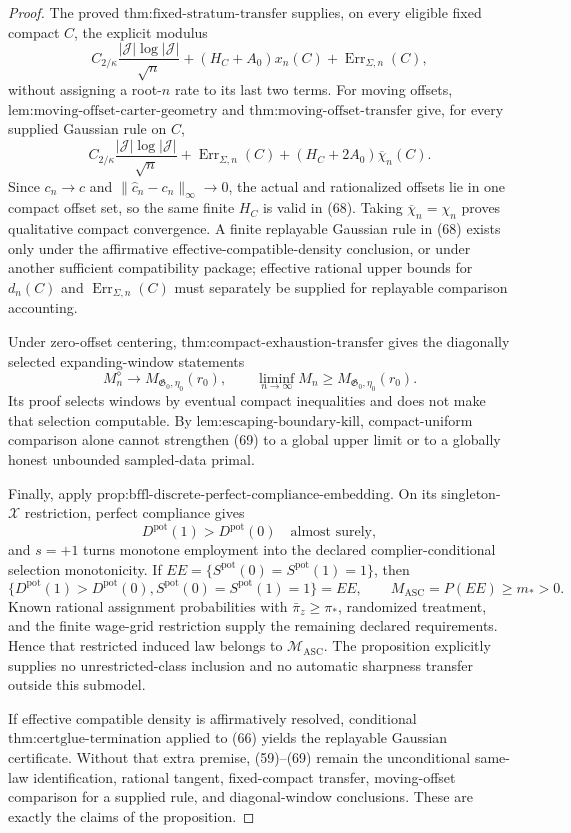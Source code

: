 \documentclass{article}
\begin{document}
\begin{proof}
The proved \(\text{thm:fixed-stratum-transfer}\) supplies, on every eligible fixed compact \(C\), the explicit modulus
\[
 C_{2/\kappa}\frac{|\mathcal J|\log|\mathcal J|}{\sqrt n}
 +(H_C+A_0)x_n(C)+\operatorname{Err}_{\Sigma,n}(C),
 \tag{67}
\]
without assigning a root-\(n\) rate to its last two terms.  For moving offsets, \(\text{lem:moving-offset-carter-geometry}\) and \(\text{thm:moving-offset-transfer}\) give, for every supplied Gaussian rule on \(C\),
\[
 C_{2/\kappa}\frac{|\mathcal J|\log|\mathcal J|}{\sqrt n}
 +\operatorname{Err}_{\Sigma,n}(C)
 +(H_C+2A_0)\overline\chi_n(C).
 \tag{68}
\]
Since \(c_n\to c\) and \(\|\widehat c_n-c_n\|_\infty\to0\), the actual and rationalized offsets lie in one compact offset set, so the same finite \(H_C\) is valid in (68).  Taking \(\overline\chi_n=\chi_n\) proves qualitative compact convergence.  A finite replayable Gaussian rule in (68) exists only under the affirmative effective-compatible-density conclusion, or under another sufficient compatibility package; effective rational upper bounds for \(d_n(C)\) and \(\operatorname{Err}_{\Sigma,n}(C)\) must separately be supplied for replayable comparison accounting.

Under zero-offset centering, \(\text{thm:compact-exhaustion-transfer}\) gives the diagonally selected expanding-window statements
\[
 M_n^{\diamond}\longrightarrow M_{\mathfrak G_0,\eta_0}(r_0),
 \qquad
 \liminf_{n\to\infty}M_n
 \ge M_{\mathfrak G_0,\eta_0}(r_0).
 \tag{69}
\]
Its proof selects windows by eventual compact inequalities and does not make that selection computable.  By \(\text{lem:escaping-boundary-kill}\), compact-uniform comparison alone cannot strengthen (69) to a global upper limit or to a globally honest unbounded sampled-data primal.

Finally, apply \(\text{prop:bffl-discrete-perfect-compliance-embedding}\).  On its singleton-\(\mathcal X\) restriction, perfect compliance gives
\[
 D^{\mathrm{pot}}(1)>D^{\mathrm{pot}}(0)
 \quad\text{almost surely},
 \tag{70}
\]
and \(s=+1\) turns monotone employment into the declared complier-conditional selection monotonicity.  If \(EE=\{S^{\mathrm{pot}}(0)=S^{\mathrm{pot}}(1)=1\}\), then
\[
 \{D^{\mathrm{pot}}(1)>D^{\mathrm{pot}}(0),
 S^{\mathrm{pot}}(0)=S^{\mathrm{pot}}(1)=1\}=EE,
 \qquad
 M_{\mathrm{ASC}}=P(EE)\ge m_*>0.
 \tag{71}
\]
Known rational assignment probabilities with \(\bar\pi_z\ge\pi_*\), randomized treatment, and the finite wage-grid restriction supply the remaining declared requirements.  Hence that restricted induced law belongs to \(\mathcal M_{\mathrm{ASC}}\).  The proposition explicitly supplies no unrestricted-class inclusion and no automatic sharpness transfer outside this submodel.

If effective compatible density is affirmatively resolved, conditional \(\text{thm:certglue-termination}\) applied to (66) yields the replayable Gaussian certificate.  Without that extra premise, (59)--(69) remain the unconditional same-law identification, rational tangent, fixed-compact transfer, moving-offset comparison for a supplied rule, and diagonal-window conclusions.  These are exactly the claims of the proposition.
\end{proof}
\end{document}
